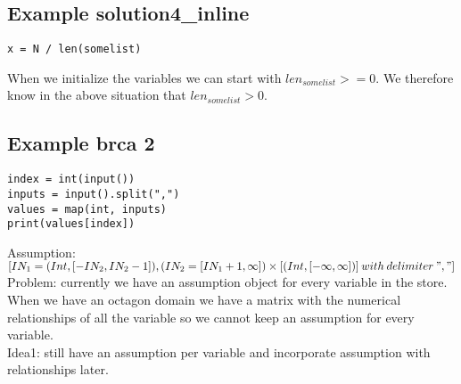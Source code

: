 \documentclass[11pt]{article}
\begin{document}
\subsection{Example solution4\_inline}
\begin{lstlisting}
x = N / len(somelist)
\end{lstlisting}

When we initialize the variables we can start with $len_{somelist} >= 0$. We therefore know in the above situation that $len_{somelist} > 0$.


\subsection{Example brca 2}
\begin{lstlisting}
index = int(input())
inputs = input().split(",")
values = map(int, inputs)
print(values[index])
\end{lstlisting}


Assumption: $[IN_1 = (Int, [-IN_2, IN_2-1]), (IN_2 = [IN_1+1, \infty]) \times [(Int, [-\infty, \infty])]\:with\:delimiter\:","]$\\


Problem: currently we have an assumption object for every variable in the store. When we have an octagon domain we have a matrix with the numerical relationships of all the variable so we cannot keep an assumption for every variable.\\
Idea1: still have an assumption per variable and incorporate assumption with relationships later.
\end{document}
